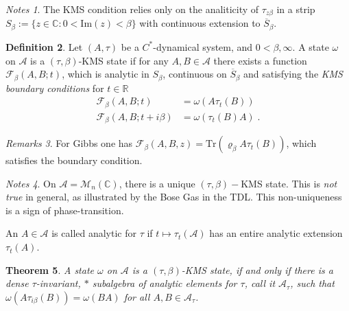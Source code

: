 \documentclass[
a4paper, %
11pt, %
onecolumn, %
openany, %
]{memoir}
\theoremstyle{definition}
\newtheorem{definition}{Definition}[chapter]
\theoremstyle{remark}
\newtheorem{remarks}[definition]{Remarks}
\newtheorem{notes}[definition]{Notes}
\theoremstyle{plain}
\newtheorem{theorem}[definition]{Theorem}
\begin{document}
\begin{notes}The KMS condition relies only on the analiticity of $\tau_{z\beta}$ in a strip $S_{\beta}:=\{z\in \mathbb{C}:0<\mathrm{Im}(z)<\beta\}$ with continuous extension to $\overline{S}_{\beta}$.
	\end{notes}
\begin{definition}
	Let $(A,\tau)$ be a $C^*$-dynamical system, and $0<\beta,\infty$. A state $\omega$ on $\mathcal{A}$ is a $(\tau,\beta)$-KMS state if for any $A,B\in \mathcal{A}$ there exists a function $\mathcal{F}_{\beta}(A,B;t)$, which is analytic in $S_{\beta}$, continuous on $\overline{S}_{\beta}$ and satisfying the \textit{KMS boundary conditions} for $t\in\mathbb{R}$ \begin{align}
	\mathcal{F}_{\beta}(A,B;t)&=\omega(A\tau_t(B))\\
	\mathcal{F}_{\beta}(A,B;t+i\beta)&=\omega(\tau_t(B)A)\; .
	\end{align}
\end{definition}
\begin{remarks}
	For Gibbs one has $\mathcal{F}_{\beta}(A,B,z)=\mathrm{Tr}(\varrho_{\beta}A\tau_t(B))$, which satisfies the boundary condition.
\end{remarks}
\begin{notes}
	On $\mathcal{A}=\mathcal{M}_n(\mathbb{C})$, there is a unique $(\tau,\beta)-$KMS state. This is \textit{not true} in general, as illustrated by the Bose Gas in  the TDL. This non-uniqueness is a sign of phase-transition.
\end{notes}
An $A\in\mathcal{A}$ is called analytic for $\tau$ if $t\mapsto \tau_t(\mathcal{A})$ has an entire analytic extension $\tau_t(A)$.
\begin{theorem}
	A state $\omega$ on $\mathcal{A}$ is a $(\tau,\beta)$-KMS state, if and only if there is a dense $\tau$-invariant, $*$ subalgebra of analytic elements for $\tau$, call it $\mathcal{A}_{\tau}$, such that $\omega(A\tau_{i\beta}(B))=\omega(BA)$ for all $A,B\in \mathcal{A}_{\tau}$.
\end{theorem}
\end{document}
